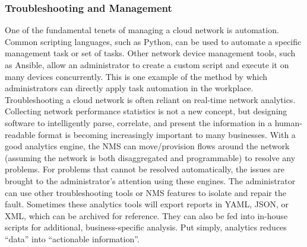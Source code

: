 \subsubsection{Troubleshooting and Management}
One of the fundamental tenets of managing a cloud network is automation.
Common scripting languages, such as Python, can be used to automate a specific
management task or set of tasks. Other network device management tools, such
as Ansible, allow an administrator to create a custom script and execute it on
many devices concurrently. This is one example of the method by which
administrators can directly apply task automation in the workplace. \\

Troubleshooting a cloud network is often reliant on real-time network
analytics. Collecting network performance statistics is not a new concept, but
designing software to intelligently parse, correlate, and present the
information in a human-readable format is becoming increasingly important to
many businesses. With a good analytics engine, the NMS can move/provision
flows around the network (assuming the network is both disaggregated and
programmable) to resolve any problems. For problems that cannot be resolved
automatically, the issues are brought to the administrator’s attention using
these engines. The administrator can use other troubleshooting tools or NMS
features to isolate and repair the fault. Sometimes these analytics tools will
export reports in YAML, JSON, or XML, which can be archived for reference.
They can also be fed into in-house scripts for additional, business-specific
analysis. Put simply, analytics reduces ``data'' into ``actionable information''.
